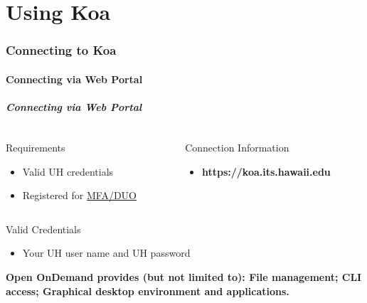 \part{Using Koa}
\begin{frame}
			 \partpage
\end{frame}


\section[Connecting to Koa]{Connecting to Koa}
\subsection[Connecting via Web Portal]{Connecting via Web Portal}

\begin{frame}
\frametitle{Connecting via Web Portal}
\begin{columns}
	\begin{column}{0.46\textwidth}
		\begin{block}{Requirements}
			\begin{itemize}
				\item Valid UH credentials 
				\item Registered for \href{http://www.hawaii.edu/its/uhlogin/}{MFA/DUO}
			\end{itemize}
                        \end{block}
	\end{column}
	\begin{column}{0.46\textwidth}
		\begin{block}{Connection Information}\
	\begin{itemize}
		  \item \textbf{https://koa.its.hawaii.edu}
	\end{itemize}
        \end{block}
	        \end{column}                
	\end{columns}
	\begin{block}{Valid Credentials}\footnotesize
		\begin{itemize}
			\item Your UH user name and UH password
		\end{itemize}
	\end{block}
	\begin{center}\scriptsize
	\textbf{\large Open OnDemand provides (but not limited to): File management; CLI access; Graphical desktop environment and applications.}
	\end{center}
\end{frame}


